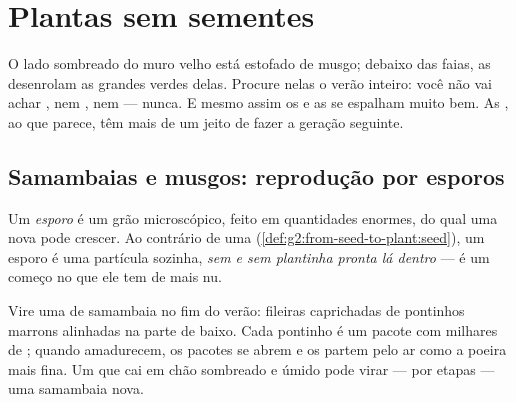 \chapter{Plantas sem sementes}\label{ch:g4:plants-without-seeds}

O lado sombreado do muro velho está estofado de musgo; debaixo das
faias, as  desenrolam as grandes  verdes delas.
Procure nelas o verão inteiro: você não vai achar , nem ,
nem  --- nunca. E mesmo assim os  e as  se
espalham muito bem. As , ao que parece, têm mais de um jeito
de fazer a geração seguinte.

\section{Samambaias e musgos: reprodução por esporos}

\begin{definition}[Esporo]\label{def:g4:plants-without-seeds:spore}
Um \emph{esporo} é um grão microscópico, feito em
quantidades enormes, do qual uma  nova pode crescer. Ao
contrário de uma 
(\cref{def:g2:from-seed-to-plant:seed}), um esporo é uma partícula
sozinha, \emph{sem  e sem plantinha pronta lá
dentro} --- é um começo no que ele tem de mais nu.
\end{definition}

\begin{example}\label{ex:g4:plants-without-seeds:fern}
Vire uma  de samambaia no fim do verão: fileiras caprichadas de
pontinhos marrons alinhadas na parte de baixo. Cada pontinho é um
pacote com milhares de ; quando amadurecem, os pacotes se
abrem e os  partem pelo ar como a poeira mais fina. Um 
que cai em chão sombreado e úmido pode virar --- por etapas --- uma
samambaia nova.
\end{example}

